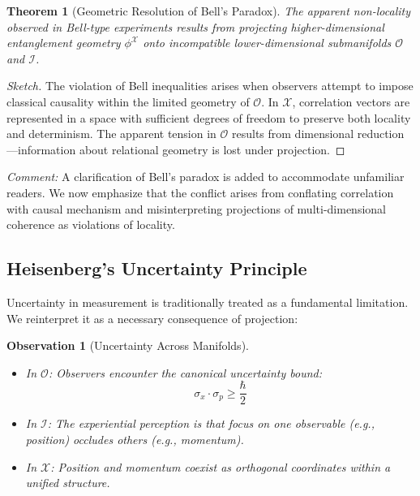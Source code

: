 \documentclass{article}
\newtheorem{theorem}{Theorem}
\newtheorem{observation}{Observation}
\begin{document}
\begin{theorem}[Geometric Resolution of Bell's Paradox]
The apparent non-locality observed in Bell-type experiments results from projecting higher-dimensional entanglement geometry $\phi^{\mathcal{X}}$ onto incompatible lower-dimensional submanifolds $\mathcal{O}$ and $\mathcal{I}$.
\end{theorem}

\begin{proof}[Sketch]
The violation of Bell inequalities arises when observers attempt to impose classical causality within the limited geometry of $\mathcal{O}$. In $\mathcal{X}$, correlation vectors are represented in a space with sufficient degrees of freedom to preserve both locality and determinism. The apparent tension in $\mathcal{O}$ results from dimensional reduction—information about relational geometry is lost under projection.
\end{proof}

\textit{Comment:} A clarification of Bell's paradox is added to accommodate unfamiliar readers. We now emphasize that the conflict arises from conflating correlation with causal mechanism and misinterpreting projections of multi-dimensional coherence as violations of locality.

\subsection{Heisenberg's Uncertainty Principle}

Uncertainty in measurement is traditionally treated as a fundamental limitation. We reinterpret it as a necessary consequence of projection:

\begin{observation}[Uncertainty Across Manifolds]\
\begin{itemize}
    \item In $\mathcal{O}$: Observers encounter the canonical uncertainty bound:
    \begin{equation}
    \sigma_x \cdot \sigma_p \geq \frac{\hbar}{2}
    \end{equation}
    
    \item In $\mathcal{I}$: The experiential perception is that focus on one observable (e.g., position) occludes others (e.g., momentum).

    \item In $\mathcal{X}$: Position and momentum coexist as orthogonal coordinates within a unified structure.
\end{itemize}
\end{observation}
\end{document}
